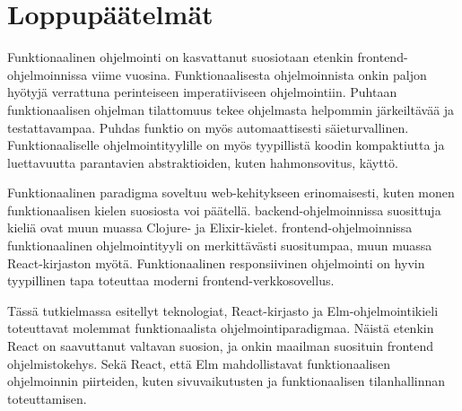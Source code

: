 \chapter{Loppupäätelmät}
Funktionaalinen ohjelmointi on kasvattanut suosiotaan etenkin frontend-ohjelmoinnissa viime vuosina.
Funktionaalisesta ohjelmoinnista onkin paljon hyötyjä verrattuna perinteiseen imperatiiviseen ohjelmointiin. Puhtaan
funktionaalisen ohjelman tilattomuus tekee ohjelmasta helpommin järkeiltävää ja testattavampaa. Puhdas funktio on myös
automaattisesti säieturvallinen. Funktionaaliselle ohjelmointityylille on myös tyypillistä koodin kompaktiutta ja
luettavuutta parantavien abstraktioiden, kuten hahmonsovitus, käyttö.

Funktionaalinen paradigma soveltuu web-kehitykseen erinomaisesti, kuten monen funktionaalisen kielen suosiosta voi
päätellä. backend-ohjelmoinnissa suosittuja kieliä ovat muun muassa Clojure- ja Elixir-kielet. frontend-ohjelmoinnissa
funktionaalinen ohjelmointityyli on merkittävästi suositumpaa, muun muassa React-kirjaston myötä. Funktionaalinen
responsiivinen ohjelmointi on hyvin tyypillinen tapa toteuttaa moderni frontend-verkkosovellus.

Tässä tutkielmassa esitellyt teknologiat, React-kirjasto ja Elm-ohjelmointikieli toteuttavat molemmat funktionaalista
ohjelmointiparadigmaa. Näistä etenkin React on saavuttanut valtavan suosion, ja onkin maailman suosituin frontend
ohjelmistokehys. Sekä React, että Elm mahdollistavat funktionaalisen ohjelmoinnin piirteiden, kuten sivuvaikutusten
ja funktionaalisen tilanhallinnan toteuttamisen.